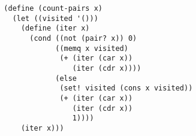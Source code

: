 \documentclass[a4paper,12pt]{article}
\begin{document}
\begin{lstlisting}
  (define (count-pairs x)
    (let ((visited '()))
      (define (iter x)
        (cond ((not (pair? x)) 0)
              ((memq x visited)
               (+ (iter (car x))
                  (iter (cdr x))))
              (else
               (set! visited (cons x visited))
               (+ (iter (car x))
                  (iter (cdr x))
                  1))))
      (iter x)))
\end{lstlisting}
\end{document}
